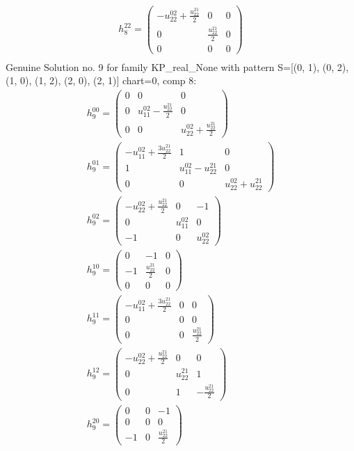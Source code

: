 \documentclass[a4paper, 11pt, twoside, onecolumn]{article}
\begin{document}
\begin{landscape}
\begin{gather*}
	 h_{8}^{22}=\begin{pmatrix}- u^{02}_{22} + \frac{u^{21}_{22}}{2} & 0 & 0\\0 & \frac{u^{21}_{22}}{2} & 0\\0 & 0 & 0\end{pmatrix}\\ 
\end{gather*} 
Genuine Solution no. 9 for family KP_real_None with pattern S=[(0, 1), (0, 2), (1, 0), (1, 2), (2, 0), (2, 1)] chart=0, comp 8: 
\begin{gather*} 
	 h_{9}^{00}=\begin{pmatrix}0 & 0 & 0\\0 & u^{02}_{11} - \frac{u^{21}_{22}}{2} & 0\\0 & 0 & u^{02}_{22} + \frac{u^{21}_{22}}{2}\end{pmatrix}\\ 
	 h_{9}^{01}=\begin{pmatrix}- u^{02}_{11} + \frac{3 u^{21}_{22}}{2} & 1 & 0\\1 & u^{02}_{11} - u^{21}_{22} & 0\\0 & 0 & u^{02}_{22} + u^{21}_{22}\end{pmatrix}\\ 
	 h_{9}^{02}=\begin{pmatrix}- u^{02}_{22} + \frac{u^{21}_{22}}{2} & 0 & -1\\0 & u^{02}_{11} & 0\\-1 & 0 & u^{02}_{22}\end{pmatrix}\\ 
	 h_{9}^{10}=\begin{pmatrix}0 & -1 & 0\\-1 & \frac{u^{21}_{22}}{2} & 0\\0 & 0 & 0\end{pmatrix}\\ 
	 h_{9}^{11}=\begin{pmatrix}- u^{02}_{11} + \frac{3 u^{21}_{22}}{2} & 0 & 0\\0 & 0 & 0\\0 & 0 & \frac{u^{21}_{22}}{2}\end{pmatrix}\\ 
	 h_{9}^{12}=\begin{pmatrix}- u^{02}_{22} + \frac{u^{21}_{22}}{2} & 0 & 0\\0 & u^{21}_{22} & 1\\0 & 1 & - \frac{u^{21}_{22}}{2}\end{pmatrix}\\ 
	 h_{9}^{20}=\begin{pmatrix}0 & 0 & -1\\0 & 0 & 0\\-1 & 0 & \frac{u^{21}_{22}}{2}\end{pmatrix}\\ 

\end{gather*}
\end{landscape}
\end{document}
